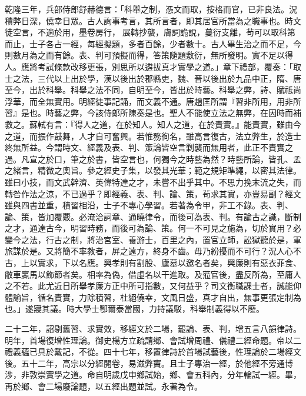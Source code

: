 \begin{pinyinscope}
乾隆三年，兵部侍郎舒赫德言：「科舉之制，憑文而取，按格而官，已非良法。況積弊日深，僥幸日眾。古人詢事考言，其所言者，即其居官所當為之職事也。時文徒空言，不適於用，墨卷房行，展轉抄襲，膚詞詭說，蔓衍支離，茍可以取科第而止，士子各占一經，每經擬題，多者百餘，少者數十。古人畢生治之而不足，今則數月為之而有餘。表、判可預擬而得，答策隨題敷衍，無所發明。實不足以得人。應將考試條款改移更張，別思所以遴拔真才實學之道。」章下禮部，覆奏：「取士之法，三代以上出於學，漢以後出於郡縣吏，魏、晉以後出於九品中正，隋、唐至今，出於科舉。科舉之法不同，自明至今，皆出於時藝。科舉之弊，詩、賦祗尚浮華，而全無實用。明經徒事記誦，而文義不通。唐趙匡所謂『習非所用，用非所習』是也。時藝之弊，今該侍郎所陳奏是也。聖人不能使立法之無弊，在因時而補救之。蘇軾有言：『得人之道，在於知人。知人之道，在於責實。』能責實，雖由今之道，而振作鼓舞，人才自可奮興。若惟務徇名，雖高言復古，法立弊生，於造士終無所益。今謂時文、經義及表、判、策論皆空言剿襲而無用者，此正不責實之過。凡宣之於口，筆之於書，皆空言也，何獨今之時藝為然？時藝所論，皆孔、孟之緒言，精微之奧旨。參之經史子集，以發其光華；範之規矩準繩，以密其法律。雖曰小技，而文武幹濟、英偉特達之才，未嘗不出乎其中。不思力挽末流之失，而轉咎作法之涼，不已過乎？即經義、表、判、論、策，茍求其實，亦豈易副？經文雖與四書並重，積習相沿，士子不專心學習。若著為令甲，非工不錄。表、判、論、策，皆加覆覈。必淹洽詞章、通曉律令，而後可為表、判。有論古之識，斷制之才，通達古今，明習時務，而後可為論、策。何一不可見之施為，切於實用？必變今之法，行古之制，將治宮室、養游士，百里之內，置官立師，訟獄聽於是，軍旅謀於是。又將簡不率教者，屏之遠方，終身不齒。毋乃紛擾而不可行？況人心不古，上以實求，下以名應。興孝則有割股、廬墓以邀名者矣，興廉則有惡衣菲食、敝車羸馬以飾節者矣。相率為偽，借虛名以干進取。及蒞官後，盡反所為，至庸人之不若。此尤近日所舉孝廉方正中所可指數，又何益乎？司文衡職課士者，誠能仰體諭旨，循名責實，力除積習，杜絕僥幸，文風日盛，真才自出，無事更張定制為也。」遂寢其議。時大學士鄂爾泰當國，力持議駁，科舉制義得以不廢。

二十二年，詔剔舊習、求實效，移經文於二場，罷論、表、判，增五言八韻律詩。明年，首場復增性理論。御史楊方立疏請鄉、會試增周禮、儀禮二經命題。帝以二禮義蘊已具於戴記，不從。四十七年，移置律詩於首場試藝後，性理論於二場經文後。五十二年，高宗以分經閱卷，易滋弊竇。且士子專治一經，於他經不旁通博涉，非敦崇實學之道。命自明歲戊申鄉試始，鄉、會五科內，分年輪試一經。畢，再於鄉、會二場廢論題，以五經出題並試。永著為令。


\end{pinyinscope}
